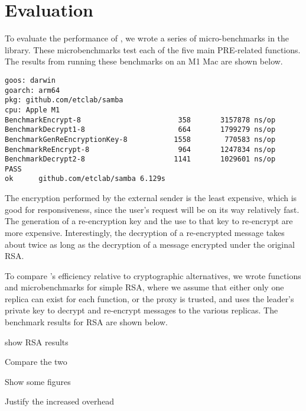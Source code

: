 \section{Evaluation}
\label{sec:evaluation}


To evaluate the performance of \SystemName, we wrote a series of micro-benchmarks in the library.
These microbenchmarks test each of the five main \SystemName PRE-related functions.
The results from running these benchmarks on an M1 Mac are shown below.

{\footnotesize
\begin{verbatim}goos: darwin
goarch: arm64
pkg: github.com/etclab/samba
cpu: Apple M1
BenchmarkEncrypt-8              	     358	   3157878 ns/op
BenchmarkDecrypt1-8             	     664	   1799279 ns/op
BenchmarkGenReEncryptionKey-8   	    1558	    770583 ns/op
BenchmarkReEncrypt-8            	     964	   1247834 ns/op
BenchmarkDecrypt2-8             	    1141	   1029601 ns/op
PASS
ok  	github.com/etclab/samba	6.129s
\end{verbatim}
}

The encryption performed by the external sender is the least expensive, which is good for responsiveness, since the user's request will be on its way relatively fast.
The generation of a re-encryption key and the use to that key to re-encrypt are more expensive.
Interestingly, the decryption of a re-encrypted message takes about twice as long as the decryption of a message encrypted under the original RSA.

To compare \SystemName's efficiency relative to cryptographic alternatives, we wrote functions and microbenchmarks for simple RSA, where we assume that either only one replica can exist for each function, or the proxy is trusted, and uses the leader's private key to decrypt and re-encrypt messages to the various replicas.
The benchmark results for RSA are shown below.

\color{red}
show RSA results

Compare the two

Show some figures

Justify the increased overhead
\color{black}



